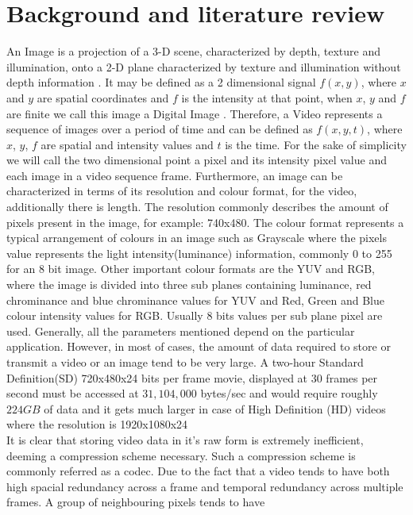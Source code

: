 \documentclass[a4paper,11pt,oneside]{article}
\begin{document}
\section{Background and literature review}
\indent An Image is a projection of a 3-D scene, characterized by depth, texture and illumination, onto a 2-D plane characterized by texture and illumination
without depth information \cite[p.~5]{richardson2002video}. It may be defined as a 2 dimensional signal $ f(x, y) $, where $x$ and $y$ are spatial
coordinates and $f$ is the intensity at that point, when $x$, $y$ and $f$ are finite we call this image a Digital Image \cite[p.~1]{gonzalez2008digital}.
Therefore, a Video represents a sequence of images over a period of time and can be defined as $f(x,y,t)$, where $x$, $y$, $f$ are spatial and intensity values
and $t$ is the time.
For the sake of simplicity we will call the two dimensional point a pixel and its intensity pixel value and each image in a video sequence frame.
Furthermore, an image can be characterized in terms of its resolution and colour format, for the video, additionally there is length. The resolution
commonly describes the amount of pixels present in the image, for example: 740x480. The colour format represents a typical arrangement of colours in an image such as Grayscale
where the pixels value represents the light intensity(luminance) information, commonly 0 to 255 for an 8 bit image. Other important colour formats are the YUV and RGB, where the
image is divided into three sub planes containing luminance, red chrominance and blue chrominance values for YUV and Red, Green and Blue colour intensity values for RGB. Usually 8
bits values per sub plane pixel   are used. Generally, all the parameters mentioned depend on the particular application. However, in most of cases, the amount of data required to
store or transmit a video or an image tend to be very large. A two-hour Standard Definition(SD) 720x480x24 bits per frame movie, displayed at 30 frames per second must be accessed
at $ 31,104,000 $ bytes/sec
and would require roughly $224 GB$ of data and it gets much larger in case of High Definition (HD) videos where the resolution is 1920x1080x24 \cite[p.~525-526]{gonzalez2008digital} \\
\indent It is clear that storing video data in it's raw form is extremely inefficient, deeming a compression scheme necessary. Such a compression scheme is commonly referred as a codec.
Due to the fact that a video tends to have both high spacial redundancy across a frame and temporal redundancy across multiple frames. A group of neighbouring pixels tends to have
\end{document}
